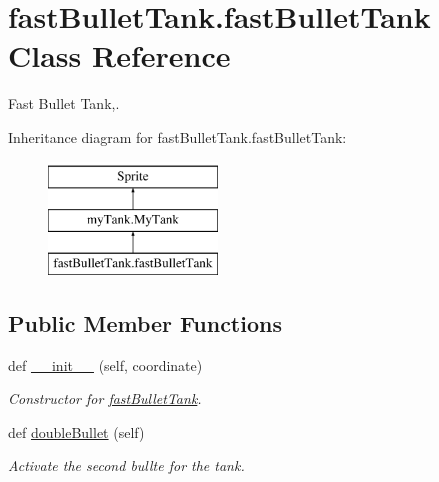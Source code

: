 \hypertarget{classfast_bullet_tank_1_1fast_bullet_tank}{}\section{fast\+Bullet\+Tank.\+fast\+Bullet\+Tank Class Reference}
\label{classfast_bullet_tank_1_1fast_bullet_tank}


Fast Bullet Tank,.  


Inheritance diagram for fast\+Bullet\+Tank.\+fast\+Bullet\+Tank\+:\begin{figure}[H]
\begin{center}
\leavevmode
\includegraphics[height=3.000000cm]{classfast_bullet_tank_1_1fast_bullet_tank}
\end{center}
\end{figure}
\subsection*{Public Member Functions}
\begin{DoxyCompactItemize}
\item 
def \mbox{\hyperlink{classfast_bullet_tank_1_1fast_bullet_tank_a7e2b91d0e75f219ffeea3f099c37961e}{\+\_\+\+\_\+init\+\_\+\+\_\+}} (self, coordinate)
\begin{DoxyCompactList}\small\item\em Constructor for \mbox{\hyperlink{classfast_bullet_tank_1_1fast_bullet_tank}{fast\+Bullet\+Tank}}. \end{DoxyCompactList}\item 
def \mbox{\hyperlink{classfast_bullet_tank_1_1fast_bullet_tank_af9637570833b43e84e999cfc3ca41e20}{double\+Bullet}} (self)
\begin{DoxyCompactList}\small\item\em Activate the second bullte for the tank. \end{DoxyCompactList}\end{DoxyCompactItemize}
